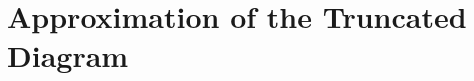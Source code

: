 \documentclass[12pt]{article}
\begin{document}
\clearpage
\section{Approximation of the Truncated Diagram}
  




% 
%
% 
%
%
% 
\end{document}
